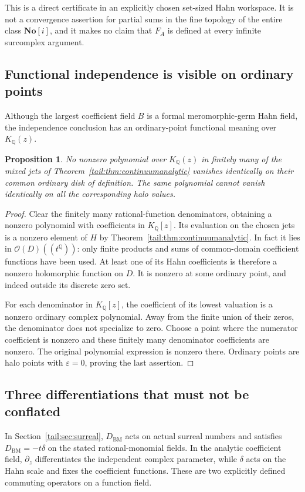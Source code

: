 \documentclass[11pt,a4paper]{article}
\numberwithin{equation}{section}
\newtheorem{proposition}[theorem]{Proposition}
\theoremstyle{definition}
\theoremstyle{remark}
\newcommand{\No}{\mathbf{No}}
\newcommand{\Q}{\mathbb Q}
\newcommand{\OO}{\mathcal O}
\newcommand{\BM}{D_{\mathrm{BM}}}
\newcommand{\EDer}{\delta}
\begin{document}
This is a direct certificate in an explicitly chosen set-sized Hahn
workspace. It is not a convergence assertion for partial sums in the
fine topology of the entire class $\No[i]$, and it makes no claim that
$F_A$ is defined at every infinite surcomplex argument.

\subsection{Functional independence is visible on ordinary points}
Although the largest coefficient field $B$ is a formal meromorphic-germ
Hahn field, the independence conclusion has an ordinary-point functional
meaning over $K_\Q(z)$.

\begin{proposition}\label{tail:prop:functionalmeaning}
No nonzero polynomial over $K_\Q(z)$ in finitely many of the mixed jets
of Theorem~\ref{tail:thm:continuumanalytic} vanishes identically on their
common ordinary disk of definition. The same polynomial cannot vanish
identically on all the corresponding halo values.
\end{proposition}
\begin{proof}
Clear the finitely many rational-function denominators, obtaining a
nonzero polynomial with coefficients in $K_\Q[z]$. Its evaluation on the
chosen jets is a nonzero element of $H$ by
Theorem~\ref{tail:thm:continuumanalytic}. In fact it lies in
$\OO(D)((t^\Q))$: only finite products and sums of common-domain
coefficient functions have been used. At least one of its Hahn
coefficients is therefore a nonzero holomorphic function on $D$.
It is nonzero at some ordinary point, and indeed outside its discrete
zero set.

For each denominator in $K_\Q[z]$, the coefficient of its lowest
valuation is a nonzero ordinary complex polynomial. Away from the finite
union of their zeros, the denominator does not specialize to zero.
Choose a point where the numerator coefficient is nonzero and these
finitely many denominator coefficients are nonzero. The original
polynomial expression is nonzero there. Ordinary points are halo points
with $\varepsilon=0$, proving the last assertion.
\end{proof}

\subsection{Three differentiations that must not be conflated}
In Section~\ref{tail:sec:surreal}, $\BM$ acts on actual surreal numbers and
satisfies $\BM=-t\EDer$ on the stated rational-monomial fields. In the
analytic coefficient field, $\partial_z$ differentiates the independent
complex parameter, while $\EDer$ acts on the Hahn scale and fixes the
coefficient functions. These are two explicitly defined commuting
operators on a function field.
\end{document}
